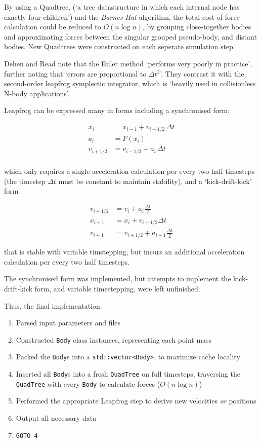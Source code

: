 \documentclass[11pt,a4paper]{article}
\begin{document}
By using a Quadtree, (`a tree datastructure in which each internal node has exactly four children') and the \textit{Barnes-Hut} algorithm\cite{barnes86a}, the total cost of force calculation could be reduced to $O(n \log n)$, by grouping close-together bodies and approximating forces between the singular grouped pseudo-body, and distant bodies. New Quadtrees were constructed on each seperate simulation step.

Dehen and Read note that the Euler method `performs very poorly in practice', further noting that `errors are proportional to $\Delta t^2$'. They contrast it with the second-order leapfrog symplectic integrator, which is `heavily used in collisionless N-body applications'.\cite{dehen11a}

Leapfrog can be expressed many in forms\cite{Skeel1993} including a synchronised form:

\begin{align*}
x_{i}&=x_{i-1}+v_{i-1/2}\,\Delta t\\
a_{i}&=F(x_{i})\\
v_{i+1/2}&=v_{i-1/2}+a_{i}\,\Delta t\\
\end{align*}

which only requires a single acceleration calculation per every two half timesteps (the timestep $\Delta t$ must be constant to maintain stability), and a `kick-drift-kick' form

\begin{align*}
v_{i+1/2}&=v_{i}+a_{i}{\frac {\Delta t}{2}}\\
x_{i+1}&=x_{i}+v_{i+1/2}\Delta t\\
v_{i+1}&=v_{i+1/2}+a_{i+1}{\frac {\Delta t}{2}}
\end{align*}

that is stable with variable timstepping, but incurs an additional acceleration calculation per every two half timesteps.

The synchronised form was implemented, but attempts to implement the kick-drift-kick form, and variable timestepping, were left unfinished.

Thus, the final implementation:

\begin{enumerate}
    \item Parsed input parameters and files
    \item Constructed \texttt{Body} class instances, representing each point mass
    \item Packed the \texttt{Body}s into a \texttt{std::vector<Body>}, to maximize cache locality
    \item Inserted all \texttt{Body}s into a fresh \texttt{QuadTree} on full timesteps, traversing the \texttt{QuadTree} with every \texttt{Body} to calculate forces ($O(n \log n)$)
    \item Performed the appropriate Leapfrog step to derive new velocities \textit{or} positions
    \item Output all necessary data
    \item \texttt{GOTO 4}
\end{enumerate}
\end{document}
